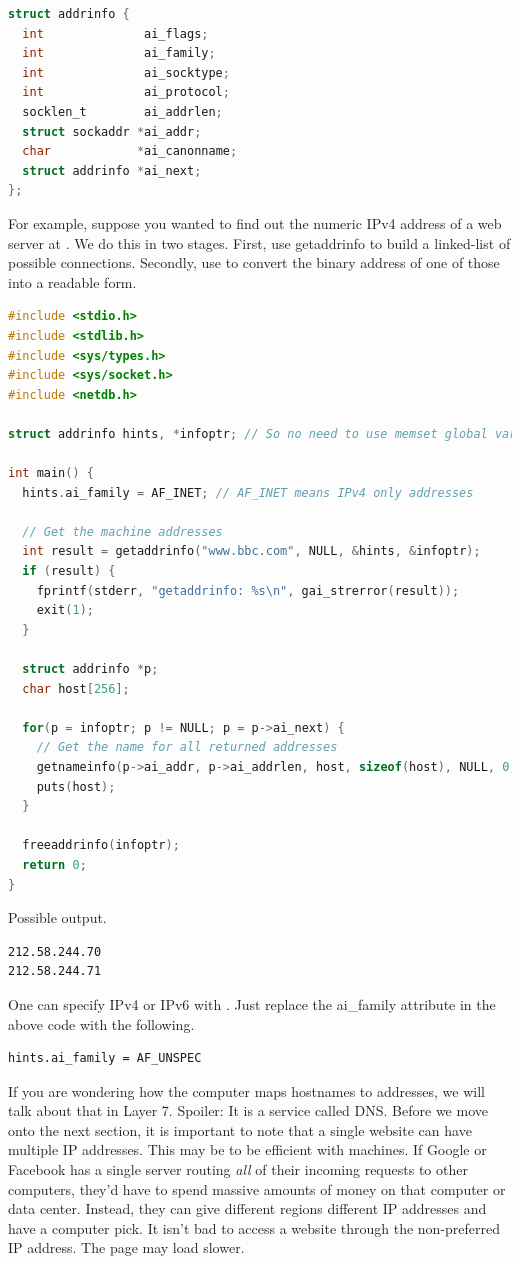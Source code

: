 \begin{lstlisting}[language=C]
struct addrinfo {
  int              ai_flags;
  int              ai_family;
  int              ai_socktype;
  int              ai_protocol;
  socklen_t        ai_addrlen;
  struct sockaddr *ai_addr;
  char            *ai_canonname;
  struct addrinfo *ai_next;
};
\end{lstlisting}

For example, suppose you wanted to find out the numeric IPv4 address of a web server at .
We do this in two stages.
First, use getaddrinfo to build a linked-list of possible connections.
Secondly, use  to convert the binary address of one of those into a readable form.

\begin{lstlisting}[language=C]
#include <stdio.h>
#include <stdlib.h>
#include <sys/types.h>
#include <sys/socket.h>
#include <netdb.h>

struct addrinfo hints, *infoptr; // So no need to use memset global variables

int main() {
  hints.ai_family = AF_INET; // AF_INET means IPv4 only addresses

  // Get the machine addresses
  int result = getaddrinfo("www.bbc.com", NULL, &hints, &infoptr);
  if (result) {
    fprintf(stderr, "getaddrinfo: %s\n", gai_strerror(result));
    exit(1);
  }

  struct addrinfo *p;
  char host[256];

  for(p = infoptr; p != NULL; p = p->ai_next) {
    // Get the name for all returned addresses
    getnameinfo(p->ai_addr, p->ai_addrlen, host, sizeof(host), NULL, 0, NI_NUMERICHOST);
    puts(host);
  }

  freeaddrinfo(infoptr);
  return 0;
}
\end{lstlisting}

Possible output.

\begin{lstlisting}
212.58.244.70
212.58.244.71
\end{lstlisting}

One can specify IPv4 or IPv6 with .
Just replace the ai\_family attribute in the above code with the following.

\begin{lstlisting}
hints.ai_family = AF_UNSPEC
\end{lstlisting}

If you are wondering how the computer maps hostnames to addresses, we will talk about that in Layer 7.
Spoiler: It is a service called DNS.
Before we move onto the next section, it is important to note that a single website can have multiple IP addresses.
This may be to be efficient with machines.
If Google or Facebook has a single server routing \textit{all} of their incoming requests to other computers, they'd have to spend massive amounts of money on that computer or data center.
Instead, they can give different regions different IP addresses and have a computer pick.
It isn't bad to access a website through the non-preferred IP address.
The page may load slower.

